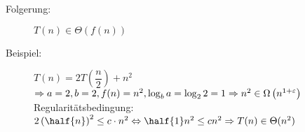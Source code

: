 \begin{description}
\begin{description}
					\item[Folgerung: ]$T(n) \in \Theta(f(n))$
					\item[Beispiel: ]$T(n) = 2 T\left(\dfrac{n}{2}\right) + n^2$\\
					$\Rightarrow a = 2, b = 2, f(n) = n^2, \log_b a = \log_2 2 = 1\\
					\Rightarrow n^2 \in \Omega\left( n^{1 + \varepsilon} \right)$\\
					Regularitätsbedingung: $2 \left(\half{n}\right)^2 \leq c\cdot n^2 \Leftrightarrow \half{1} n^2 \leq cn^2\\
					\Rightarrow T(n) \in \Theta(n^2)$
				\end{description}
		\end{description}
	